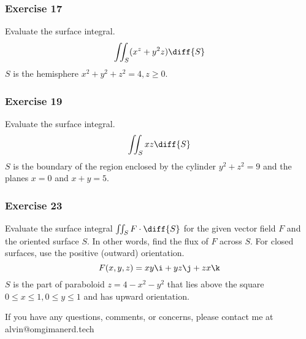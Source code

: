 \documentclass{math}
\begin{document}
\subsubsection*{Exercise 17}
Evaluate the surface integral.
\[ \iint_{S}(x^z+y^2z)\diff{S} \]
\( S \) is the hemisphere \( x^2+y^2+z^2 = 4, z\ge0 \).

\subsubsection*{Exercise 19}
Evaluate the surface integral.
\[ \iint_{S}xz\diff{S} \]
\( S \) is the boundary of the region enclosed by the cylinder \( y^2+z^2 = 9 \)
and the planes \( x = 0 \) and \( x+y = 5 \).

\subsubsection*{Exercise 23}
Evaluate the surface integral \( \iint_{S}F\cdot\diff{S} \) for the given vector
field \( F \) and the oriented surface \( S \). In other words, find the flux of
\( F \) across \( S \). For closed surfaces, use the positive (outward)
orientation.
\[ F(x,y,z) = xy\i+yz\j+zx\k \]
\( S \) is the part of paraboloid \( z = 4-x^2-y^2 \) that lies above the square
\( 0\le x\le1,0\le y\le1 \) and has upward orientation.

\begin{center}
  If you have any questions, comments, or concerns, please contact me at
  alvin@omgimanerd.tech
\end{center}
\end{document}
